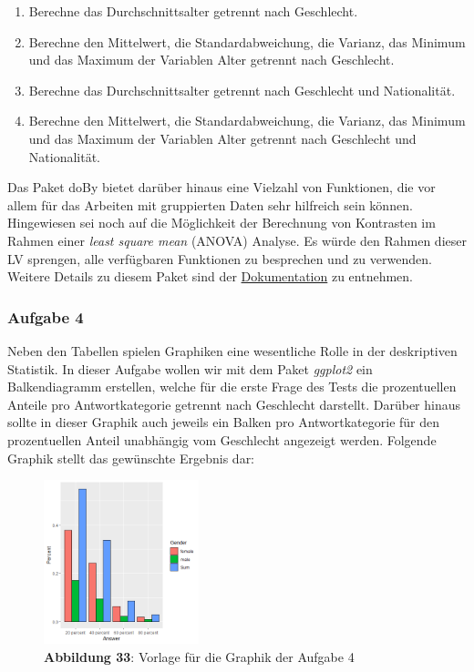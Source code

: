 \documentclass[]{article}
\providecommand{\tightlist}{%
  \setlength{\itemsep}{0pt}\setlength{\parskip}{0pt}}
\begin{document}
\begin{enumerate}
\def\labelenumi{\arabic{enumi}.}
\tightlist
\item
  Berechne das Durchschnittsalter getrennt nach Geschlecht.
\item
  Berechne den Mittelwert, die Standardabweichung, die Varianz, das
  Minimum und das Maximum der Variablen Alter getrennt nach Geschlecht.
\item
  Berechne das Durchschnittsalter getrennt nach Geschlecht und
  Nationalität.
\item
  Berechne den Mittelwert, die Standardabweichung, die Varianz, das
  Minimum und das Maximum der Variablen Alter getrennt nach Geschlecht
  und Nationalität.
\end{enumerate}

Das Paket doBy bietet darüber hinaus eine Vielzahl von Funktionen, die
vor allem für das Arbeiten mit gruppierten Daten sehr hilfreich sein
können. Hingewiesen sei noch auf die Möglichkeit der Berechnung von
Kontrasten im Rahmen einer \emph{least square mean} (ANOVA) Analyse. Es
würde den Rahmen dieser LV sprengen, alle verfügbaren Funktionen zu
besprechen und zu verwenden. Weitere Details zu diesem Paket sind der
\href{https://cran.r-project.org/web/packages/doBy/doBy.pdf}{Dokumentation}
zu entnehmen.

\subsubsection*{Aufgabe 4}\label{aufgabe-4}

Neben den Tabellen spielen Graphiken eine wesentliche Rolle in der
deskriptiven Statistik. In dieser Aufgabe wollen wir mit dem Paket
\emph{ggplot2} ein Balkendiagramm erstellen, welche für die erste Frage
des Tests die prozentuellen Anteile pro Antwortkategorie getrennt nach
Geschlecht darstellt. Darüber hinaus sollte in dieser Graphik auch
jeweils ein Balken pro Antwortkategorie für den prozentuellen Anteil
unabhängig vom Geschlecht angezeigt werden. Folgende Graphik stellt das
gewünschte Ergebnis dar:

\begin{figure}
\centering
\includegraphics[width=0.40000\textwidth]{Images/09_Aufgabe4_Graphik.PNG}
\caption{\textbf{Abbildung 33}: Vorlage für die Graphik der Aufgabe 4}
\end{figure}
\end{document}
